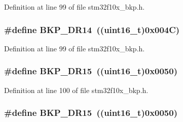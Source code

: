 Definition at line 99 of file stm32f10x\+\_\+bkp.\+h.

\subsubsection[{\texorpdfstring{B\+K\+P\+\_\+\+D\+R14}{BKP_DR14}}]{\setlength{\rightskip}{0pt plus 5cm}\#define B\+K\+P\+\_\+\+D\+R14~(({\bf uint16\+\_\+t})0x004\+C)}\hypertarget{group___data___backup___register_ga47211005caa15e93e138691ba9bf2fa1}{}\label{group___data___backup___register_ga47211005caa15e93e138691ba9bf2fa1}


Definition at line 99 of file stm32f10x\+\_\+bkp.\+h.

\subsubsection[{\texorpdfstring{B\+K\+P\+\_\+\+D\+R15}{BKP_DR15}}]{\setlength{\rightskip}{0pt plus 5cm}\#define B\+K\+P\+\_\+\+D\+R15~(({\bf uint16\+\_\+t})0x0050)}\hypertarget{group___data___backup___register_ga230f292dd8ef4e259630fd4f37d75869}{}\label{group___data___backup___register_ga230f292dd8ef4e259630fd4f37d75869}


Definition at line 100 of file stm32f10x\+\_\+bkp.\+h.

\subsubsection[{\texorpdfstring{B\+K\+P\+\_\+\+D\+R15}{BKP_DR15}}]{\setlength{\rightskip}{0pt plus 5cm}\#define B\+K\+P\+\_\+\+D\+R15~(({\bf uint16\+\_\+t})0x0050)}\hypertarget{group___data___backup___register_ga230f292dd8ef4e259630fd4f37d75869}{}\label{group___data___backup___register_ga230f292dd8ef4e259630fd4f37d75869}


